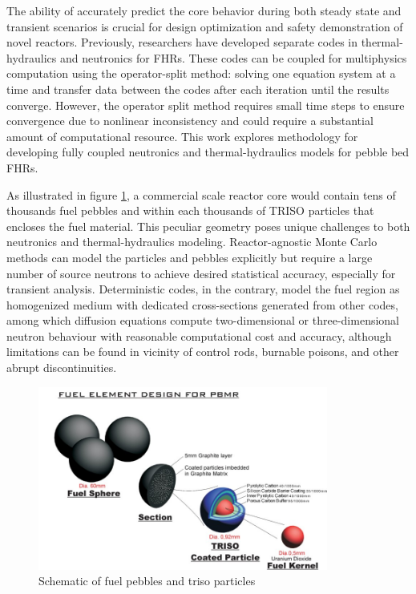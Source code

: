 \documentclass{elsarticle}
\begin{document}
The ability of accurately predict the core behavior during both steady state and transient scenarios is crucial for design optimization and safety demonstration of novel reactors.
Previously, researchers have developed separate codes in thermal-hydraulics\cite{Scarlat2012} and neutronics\cite{Cisneros2013} for FHRs. These codes can be coupled for multiphysics computation using the operator-split method: solving one equation system at a time and transfer data between the codes after each iteration until the results converge. However, the operator split method requires small time steps to ensure convergence due to nonlinear inconsistency\cite{Ragusa2009} and could require a substantial amount of computational resource. This work explores methodology for developing fully coupled neutronics and thermal-hydraulics models for pebble bed FHRs.  

As illustrated in figure \ref{fig:triso}, a commercial scale reactor core would contain tens of thousands fuel pebbles and within each thousands of TRISO particles that encloses the fuel material. This peculiar geometry poses unique challenges to both neutronics and thermal-hydraulics modeling. Reactor-agnostic Monte Carlo methods can model the particles and pebbles explicitly but require a large number of source neutrons to achieve desired statistical accuracy, especially for transient analysis. Deterministic codes, in the contrary, model the fuel region as homogenized medium with dedicated cross-sections generated from other codes, among which diffusion equations compute two-dimensional or three-dimensional neutron behaviour with reasonable computational cost and accuracy, although limitations can be found in vicinity of control rods, burnable poisons, and other abrupt discontinuities.

\begin{figure}
  \centering
  \includegraphics[width=0.85\textwidth]{./images/design/TMSR_fuel.jpg}
  \caption{Schematic of fuel pebbles and triso particles}
  \label{fig:triso}
\end{figure}
\end{document}
